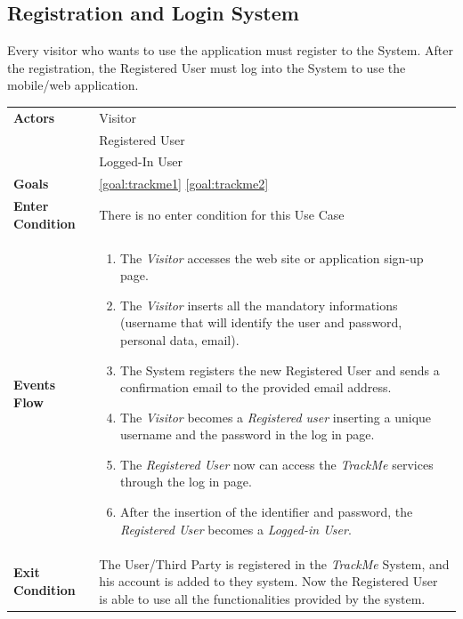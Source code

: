   \subsection{Registration and Login System}
Every visitor who wants to use the application must register to the System.
After the registration, the Registered User must log into the System to use the mobile/web application.

\begin{table}[H]
	\centering
    
    \begin{tabular}{|p{3.5cm}|p{10.3cm}|}
    	\hline
    	\textbf{\large{Actors}} & 
		Visitor \\
    	& Registered User \\
	& Logged-In User \\
    \hline
    \textbf{\large{Goals}} 				& \ref{goal:trackme1} \ref{goal:trackme2}\\
    
    \hline
    \textbf{\large{Enter Condition}}	& There is no enter condition for this Use Case		\\
    
    \hline
    \textbf{\large{Events Flow}}		& \begin{enumerate}[leftmargin=0.5cm]
                                          	\item The \emph{Visitor}  accesses the web site or application sign-up page.
                                            \item The \emph{Visitor} inserts all the mandatory informations (username that will identify the user and password, personal data, email).
                                            \item The System registers the new Registered User and sends a confirmation email to the provided email address.
                                            \item The \emph{Visitor} becomes a \emph{Registered user} inserting a unique username and the password in the log in page.  
                                            \item The \emph{Registered User} now can access the \emph{TrackMe} services through the log in page.
                                            \item After the insertion of the identifier and password, the \emph{Registered User} becomes a \emph{Logged-in User}.
                                          \end{enumerate}
    										\\
    \hline
    \textbf{\large{Exit Condition}} 	& The User/Third Party is registered in the \emph{TrackMe} System, and his account is added to they system. Now the Registered User is able to use all the functionalities provided by the system. \\
    

\end{tabular}
\end{table}
